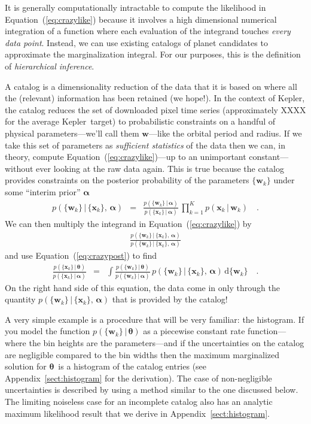 \documentclass[12pt,preprint]{aastex}
\newcommand{\project}[1]{{\sffamily #1}}
\newcommand{\kepler}{\project{Kepler}}
\newcommand{\Eq}[1]{Equation~(\ref{eq:#1})}
\newcommand{\eq}[1]{\Eq{#1}}
\newcommand{\eqlabel}[1]{\label{eq:#1}}
\newcommand{\App}[1]{Appendix~\ref{sect:#1}}
\newcommand{\app}[1]{\App{#1}}
\newcommand{\dd}{\ensuremath{\,\mathrm{d}}}
\newcommand{\bvec}[1]{\ensuremath{\boldsymbol{#1}}}
\newcommand{\ratepar}{{\ensuremath{\theta}}}
\newcommand{\ratepars}{{\ensuremath{\bvec{\ratepar}}}}
\newcommand{\data}{{\ensuremath{\bvec{x}}}}
\newcommand{\entry}{{\ensuremath{\bvec{w}}}}
\newcommand{\interim}{{\ensuremath{\bvec{\alpha}}}}
\begin{document}
It is generally computationally intractable to compute the likelihood in
\eq{crazylike} because it involves a high dimensional numerical integration of
a function where each evaluation of the integrand touches \emph{every data
point}.
Instead, we can use existing catalogs of planet candidates to approximate the
marginalization integral.
For our purposes, this is the definition of \emph{hierarchical inference}.

A catalog is a dimensionality reduction of the data that it is based on where
all the (relevant) information has been retained (we hope!).
In the context of \kepler, the catalog reduces the set of downloaded pixel
time series (approximately XXXX for the average \kepler\ target) to
probabilistic constraints on a handful of physical parameters---we'll call
them \entry---like the orbital period and radius.
If we take this set of parameters as \emph{sufficient statistics} of the data
then we can, in theory, compute \eq{crazylike}---up to an unimportant
constant---without ever looking at the raw data again.
This is true because the catalog provides constraints on the posterior
probability of the parameters $\{\entry_k\}$ under some ``interim prior''
\interim
\begin{eqnarray}\eqlabel{crazypost}
p(\{\entry_k\}\,|\,\{\data_k\},\,\interim) &=&
\frac{p(\{\entry_k\}\,|\,\interim)}{p(\{\data_k\}\,|\,\interim)}\,
\prod_{k=1}^K p(\data_k\,|\,\entry_k) \quad.
\end{eqnarray}
We can then multiply the integrand in \eq{crazylike} by
\begin{eqnarray}
\frac{p(\{\entry_k\}\,|\,\{\data_k\},\,\interim)}
     {p(\{\entry_k\}\,|\,\{\data_k\},\,\interim)}
\end{eqnarray}
and use \eq{crazypost} to find
\begin{eqnarray}
\frac{p(\{\data_k\}\,|\,\ratepars)}{p(\{\data_k\}\,|\,\interim)} &=&
    \int
    \frac{p(\{\entry_k\}\,|\,\ratepars)}{p(\{\entry_k\}\,|\,\interim)}\,
    p(\{\entry_k\}\,|\,\{\data_k\},\,\interim)
    \dd\{\entry_k\} \quad.
\end{eqnarray}
On the right hand side of this equation, the data come in only through the
quantity $p(\{\entry_k\}\,|\,\{\data_k\},\,\interim)$ that is provided by the
catalog!

A very simple example is a procedure that will be very familiar: the histogram.
If you model the function $p(\{\entry_k\}\,|\,\ratepars)$ as a piecewise
constant rate function---where the bin heights are the parameters---and if the
uncertainties on the catalog are negligible compared to the bin widths then
the maximum marginalized solution for \ratepars\ is a histogram of the
catalog entries (see \app{histogram} for the derivation).
The case of non-negligible uncertainties is described by \citet{hogge} using a
method similar to the one discussed below.
The limiting noiseless case for an incomplete catalog also has an analytic
maximum likelihood result that we derive in \app{histogram}.
\end{document}
